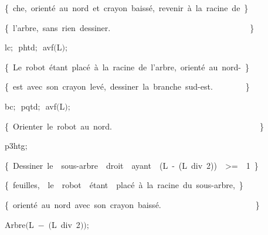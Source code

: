 {\vspace{\neglskip}\mbox{\blc  \blk\blk\blk\blk\idt  \cmt  \{\ che,\ orienté\ au\ nord\ et\ crayon\ baissé,\ revenir\ à\ la\ racine\ de\ \}\idt }\par 
\vspace{\neglskip}\mbox{\blc  \blk\blk\blk\blk\idt  \cmt  \{\ l{'}arbre,\ sans\ rien\ dessiner.\ \ \ \ \ \ \ \ \ \ \ \ \ \ \ \ \ \ \ \ \ \ \ \ \ \ \ \ \ \ \ \ \ \ \}\idt }\par 
\vspace{\neglskip}\mbox{\blc  \blk\blk\blk\blk\idt  lc$;$\ phtd$;$\ avf$($L$)$$;$\ }\par 
\vspace{\neglskip}\mbox{\blc  \blk\blk\blk\blk\idt  \cmt  \{\ Le\ robot\ étant\ placé\ à\ la\ racine\ de\ l{'}arbre,\ orienté\ au\ nord-\ \}\idt }\par 
\vspace{\neglskip}\mbox{\blc  \blk\blk\blk\blk\idt  \cmt  \{\ est\ avec\ son\ crayon\ levé,\ dessiner\ la\ branche\ sud-est.\ \ \ \ \ \ \ \ \}\idt }\par 
\vspace{\neglskip}\mbox{\blc  \blk\blk\blk\blk\idt  bc$;$\ pqtd$;$\ avf$($L$)$$;$\ }\par 
\vspace{\neglskip}\mbox{\blc  \blk\blk\blk\blk\idt  \cmt  \{\ Orienter\ le\ robot\ au\ nord.\ \ \ \ \ \ \ \ \ \ \ \ \ \ \ \ \ \ \ \ \ \ \ \ \ \ \ \ \ \ \ \ \ \ \ \ \}\idt }\par 
\vspace{\neglskip}\mbox{\blc  \blk\blk\blk\blk\idt  p3htg$;$\ }\par 
\vspace{\neglskip}\mbox{\blc  \blk\blk\blk\blk\idt  \cmt  \{\ Dessiner\ le\ \ sous-arbre\ \ droit\ \ ayant\ \ (L\ -\ (L\ div\ 2))\ \ >=\ \ 1\ \}\idt }\par 
\vspace{\neglskip}\mbox{\blc  \blk\blk\blk\blk\idt  \cmt  \{\ feuilles,\ \ le\ \ robot\ \ étant\ \ placé\ à\ la\ racine\ du\ sous-arbre,\ \}\idt }\par 
\vspace{\neglskip}\mbox{\blc  \blk\blk\blk\blk\idt  \cmt  \{\ orienté\ au\ nord\ avec\ son\ crayon\ baissé.\ \ \ \ \ \ \ \ \ \ \ \ \ \ \ \ \ \ \ \ \ \ \ \}\idt }\par 
\vspace{\neglskip}\mbox{\blc  \blk\blk\blk\blk\idt  Arbre$($L\ $-$\ $($L\ \mcl div\idt \ 2$)$$)$$;$\ }\par 
}
